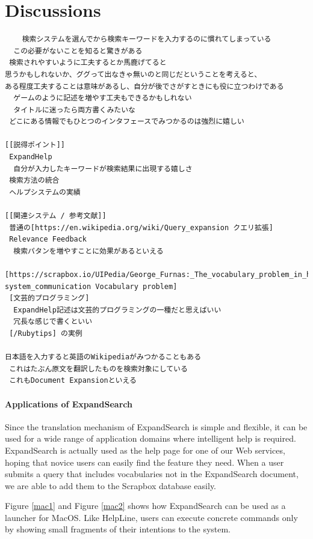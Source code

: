 \documentclass[manuscript,screen,review]{acmart}
\def\HL{\textsf{HelpLine}}
\def\ES{\textsf{ExpandSearch}}
\def\SB{\textsf{Scrapbox}}
\begin{document}
\section{Discussions}

\begin{verbatim}
    検索システムを選んでから検索キーワードを入力するのに慣れてしまっている
  この必要がないことを知ると驚きがある
 検索されやすいように工夫するとか馬鹿げてると
思うかもしれないか、ググって出なきゃ無いのと同じだということを考えると、
ある程度工夫することは意味があるし、自分が後でさがすときにも役に立つわけである
  ゲームのように記述を増やす工夫もできるかもしれない
  タイトルに迷ったら両方書くみたいな
 どこにある情報でもひとつのインタフェースでみつかるのは強烈に嬉しい

[[説得ポイント]]
 ExpandHelp
  自分が入力したキーワードが検索結果に出現する嬉しさ
 検索方法の統合
 ヘルプシステムの実績

[[関連システム / 参考文献]]
 普通の[https://en.wikipedia.org/wiki/Query_expansion クエリ拡張]
 Relevance Feedback
  検索パタンを増やすことに効果があるといえる
 [https://scrapbox.io/UIPedia/George_Furnas:_The_vocabulary_problem_in_human-system_communication Vocabulary problem]
 [文芸的プログラミング]
  ExpandHelp記述は文芸的プログラミングの一種だと思えばいい
  冗長な感じで書くといい
 [/Rubytips] の実例

日本語を入力すると英語のWikipediaがみつかることもある
 これはたぶん原文を翻訳したものを検索対象にしている
 これもDocument Expansionといえる

\end{verbatim}

\paragraph{Applications of ExpandSearch}

Since the translation mechanism of {\ES} is simple and flexible,
it can be used for a wide range of application domains where
intelligent help is required.
{\ES} is actually used as the help page for
one of our Web services, hoping that
novice users can easily find the feature they need.
When a user submits a query that includes vocabularies
not in the {\ES} document,
we are able to add them to the {\SB} database easily.

Figure \ref{mac1} and Figure \ref{mac2} shows how
{\ES} can be used as a launcher for MacOS.
Like {\HL}, users can execute concrete commands only by
showing small fragments of their intentions to the system.
\end{document}

